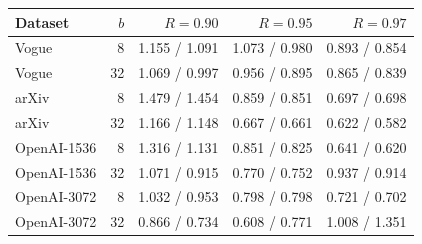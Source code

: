 \begin{tabular}{@{}lrrrr@{}}
\toprule
Dataset & $b$ & $R=0.90$ & $R=0.95$ & $R=0.97$ \\
\midrule
Vogue & 8 & 1.155 / 1.091 & 1.073 / 0.980 & 0.893 / 0.854 \\
Vogue & 32 & 1.069 / 0.997 & 0.956 / 0.895 & 0.865 / 0.839 \\
arXiv & 8 & 1.479 / 1.454 & 0.859 / 0.851 & 0.697 / 0.698 \\
arXiv & 32 & 1.166 / 1.148 & 0.667 / 0.661 & 0.622 / 0.582 \\
OpenAI-1536 & 8 & 1.316 / 1.131 & 0.851 / 0.825 & 0.641 / 0.620 \\
OpenAI-1536 & 32 & 1.071 / 0.915 & 0.770 / 0.752 & 0.937 / 0.914 \\
OpenAI-3072 & 8 & 1.032 / 0.953 & 0.798 / 0.798 & 0.721 / 0.702 \\
OpenAI-3072 & 32 & 0.866 / 0.734 & 0.608 / 0.771 & 1.008 / 1.351 \\
\bottomrule
\end{tabular}
